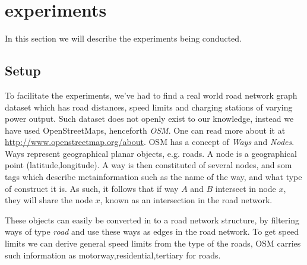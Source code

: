 \section{experiments} %
\label{sec:experiments}
In this section we will describe the experiments being conducted.
\subsection{Setup} %
\label{sub:setup}
To facilitate the experiments, we've had to find a real world road network graph dataset which has road distances, speed limits and charging stations of varying power output. Such dataset does not openly exist to our knowledge, instead we have used OpenStreetMaps, henceforth \textit{OSM}. One can read more about it at \url{http://www.openstreetmap.org/about}. OSM has a concept of \textit{Ways} and \textit{Nodes}. Ways represent geographical planar objects, e.g. roads. A node is a geographical point (latitude,longitude). A way is then constituted of several nodes, and som tags which describe metainformation such as the name of the way, and what type of construct it is. As such, it follows that if way $A$ and $B$ intersect in node $x$, they will share the node $x$, known as an intersection in the road network. 


These objects can easily be converted in to a road network structure, by filtering ways of type \textit{road} and use these ways as edges in the road network. To get speed limits we can derive general speed limits from the type of the roads, OSM carries such information as motorway,residential,tertiary for roads. 

